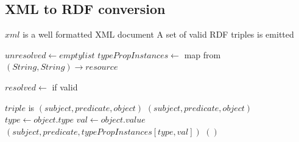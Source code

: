 \documentclass[conference]{IEEEtran}
\begin{document}
\subsection{XML to RDF conversion}
\label{xml-to-rdf-algo}
\begin{algorithmic}
        \Require $xml$ is a well formatted XML document
        \Ensure A set of valid RDF triples is emitted

        \State $unresolved\gets empty list$
        \State $typePropInstances\gets$ map from $(String, String) \rightarrow resource$

            \State {}
        \EndFor

            \State $resolved \gets$ 
            \State {} if valid
        \EndFor
    \EndFunction

        \Require $triple$ is $(subject, predicate, object)$
            \State \Return $(subject, predicate, object)$
            \State $type\gets object.type$
            \State $val\gets object.value$
                \State \Return $(subject, predicate, typePropInstances[type,val])$
            \EndIf
            \State \Return $()$
        \EndIf
    \EndFunction
\end{algorithmic}
\end{document}
